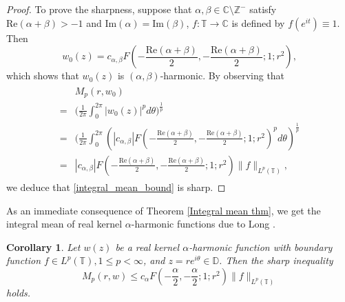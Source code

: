 \documentclass[11pt, reqno]{amsart}
\newtheorem{cor}{Corollary}
\theoremstyle{definition}
\numberwithin{equation}{section}
\theoremstyle{remark}
\numberwithin{equation}{section}
\newcommand{\ID}{{\mathbb D}}
\begin{document}
\begin{proof}
		To prove the sharpness, suppose that $\alpha,\beta\in\mathbb{C}\setminus\mathbb{Z}^-$ satisfy $\mbox{Re}(\alpha+\beta)>-1$ and $\mbox{Im}(\alpha)=\mbox{Im}(\beta)$, $f:\mathbb{T}\rightarrow\mathbb{C}$ is defined by $f(e^{it})\equiv 1$. Then $$w_0(z)= c_{\alpha,\beta}F\left(-\frac{\mbox{Re}(\alpha+\beta)}{2},-\frac{\mbox{Re}(\alpha+\beta)}{2};1;r^2\right),$$ which shows that $w_0(z)$ is $(\alpha,\beta)$-harmonic.
		By observing that
		\begin{align*}
        \begin{split}
		&M_p(r,w_0)\\=&\bigg(\frac{1}{2\pi} \int_0^{2\pi}|w_0(z)|^p d\theta\bigg)^\frac{1}{p}\\=&\bigg(\frac{1}{2\pi} \int_0^{2\pi}\left(|c_{\alpha,\beta}|F\left(-\frac{\mbox{Re}(\alpha+\beta)}{2},-\frac{\mbox{Re}(\alpha+\beta)}{2};1;r^2\right)^p d\theta\right)^\frac{1}{p}\\=&|c_{\alpha,\beta}|F\left(-\frac{\mbox{Re}(\alpha+\beta)}{2},-\frac{\mbox{Re}(\alpha+\beta)}{2};1;r^2\right)\|f\|_{L^p(\mathbb{T})},
        \end{split}
		\end{align*}
		 we deduce that \eqref{integral_mean_bound} is sharp.
	\end{proof}
	As an immediate consequence of Theorem \ref{Integral mean thm}, we get the integral mean of real kernel $\alpha$-harmonic functions due to Long \cite[Theorem 1.1]{optimal_inequalities_alpha_harmonic}.
	\begin{cor}
		Let $w(z)$ be a real kernel $\alpha$-harmonic function with boundary function $f\in L^p(\mathbb{T}) , 1\leq p< \infty$, and $z=re^{i\theta}\in \ID$. Then the sharp inequality 
		$$M_p(r,w)\leq c_{\alpha}F\left(-\frac{\alpha}{2},-\frac{\alpha}{2};1;r^2\right)\|f\|_{L^p(\mathbb{T})}$$
	holds. 
	\end{cor}
	
	
\end{document}

